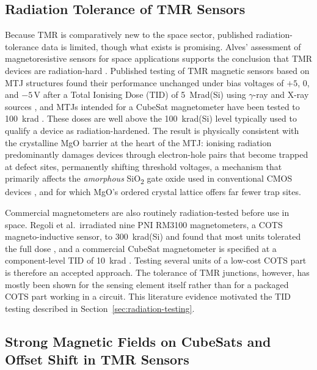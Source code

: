 \documentclass[12pt,a4paper]{article}
\begin{document}
\subsection{Radiation Tolerance of TMR Sensors}
\label{sec:rad-tolerance-lit}

Because TMR is comparatively new to the space sector, published radiation-tolerance data is limited, though what exists is promising. Alves' assessment of magnetoresistive sensors for space applications supports the conclusion that TMR devices are radiation-hard \cite{alves-thesis}. Published testing of TMR magnetic sensors based on MTJ structures found their performance unchanged under bias voltages of $+5$, $0$, and $-5\,\text{V}$ after a Total Ionising Dose (TID) of \SI{5}{\mega rad}(Si) using $\gamma$-ray and X-ray sources \cite{tmr-bias-radiation}, and MTJs intended for a CubeSat magnetometer have been tested to \SI{100}{\kilo rad} \cite{nguyen2010}. These doses are well above the \SI{100}{\kilo rad}(Si) level typically used to qualify a device as radiation-hardened. The result is physically consistent with the crystalline MgO barrier at the heart of the MTJ: ionising radiation predominantly damages devices through electron-hole pairs that become trapped at defect sites, permanently shifting threshold voltages, a mechanism that primarily affects the \emph{amorphous} SiO\textsubscript{2} gate oxide used in conventional CMOS devices \cite{tid-basics-lanl}, and for which MgO's ordered crystal lattice offers far fewer trap sites.

Commercial magnetometers are also routinely radiation-tested before use in space. Regoli et al.\ irradiated nine PNI RM3100 magnetometers, a COTS magneto-inductive sensor, to \SI{300}{\kilo rad}(Si) and found that most units tolerated the full dose \cite{regoli2020}, and a commercial CubeSat magnetometer is specified at a component-level TID of \SI{10}{\kilo rad} \cite{nss_magnetometer}. Testing several units of a low-cost COTS part is therefore an accepted approach. The tolerance of TMR junctions, however, has mostly been shown for the sensing element itself rather than for a packaged COTS part working in a circuit. This literature evidence motivated the TID testing described in Section~\ref{sec:radiation-testing}.

\subsection{Strong Magnetic Fields on CubeSats and Offset Shift in TMR Sensors}
\label{sec:strong-field-lit}
\end{document}
